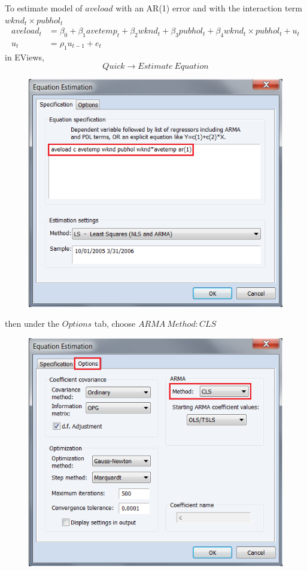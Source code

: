 \documentclass[12pt]{report}
\begin{document}
\newpage
\noindent To estimate model of $aveload$ with an AR(1) error and with the interaction term $wknd_t\times pubhol_t$ \begin{align*}
aveload_t &= \beta_0 + \beta_1 avetemp_t + \beta_2wknd_t + \beta_3pubhol_t + \beta_4wknd_t\times pubhol_t + u_t \\
u_t &= \rho_1u_{t-1} + e_t
\end{align*} in EViews, $$Quick \to Estimate\ Equation$$
\begin{figure}[H]
	\centerline{\includegraphics{tute10_15}}
\end{figure}
\vspace{-\baselineskip} then under the $Options$ tab, choose $ARMA\ Method:CLS$
\begin{figure}[H]
	\centerline{\includegraphics{tute10_12}}
\end{figure}
\end{document}
